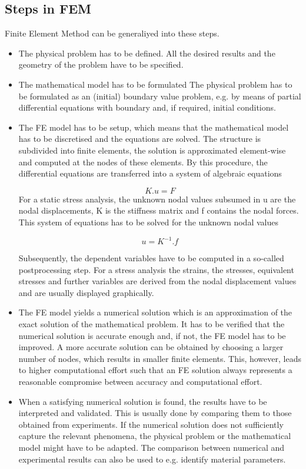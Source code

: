 \subsection{Steps in FEM}
Finite Element Method can be generaliyed into these steps.
\begin{itemize}
 
 \item The physical problem has to be defined. All the desired results and the geometry of the problem have to be specified.

\item The mathematical model has to be formulated
The physical problem has to be formulated as an (initial) boundary value problem, e.g. by means of partial differential equations with boundary and, if required, initial conditions.

\item The FE model has to be setup, which means that the mathematical model has to be discretised and the equations are solved. The structure is subdivided into finite elements, the solution is approximated element-wise and computed at the nodes of these elements. By this procedure, the differential equations are transferred into a system of algebraic equations

\begin{equation}
K.u = F
\end{equation}
For a static stress analysis, the unknown nodal values subsumed in u are the nodal displacements, K is the stiffness matrix and f contains the nodal forces. This system of equations has to be solved for the unknown nodal values

\begin{equation}
u = K^{-1}.f
\end{equation}

Subsequently, the dependent variables have to be computed in a so-called postprocessing step. For a stress analysis the strains, the stresses, equivalent stresses and further variables are derived from the nodal displacement values and are usually displayed graphically.

\item The FE model yields a numerical solution which is an approximation of the exact solution of the mathematical problem. It has to be verified that the numerical solution is accurate enough and, if not, the FE model has to be improved. A more accurate solution can be obtained by choosing a larger number of nodes, which results in smaller finite elements. This, however, leads to higher computational effort such that an FE solution always represents a reasonable compromise between accuracy and computational effort.


\item When a satisfying numerical solution is found, the results have to be interpreted and validated. This is usually done by comparing them to those obtained from experiments. If the numerical solution does not sufficiently capture the relevant phenomena, the physical problem or the mathematical model might have to be adapted. The comparison between numerical and experimental results can also be used to e.g. identify material parameters.
\end{itemize}


